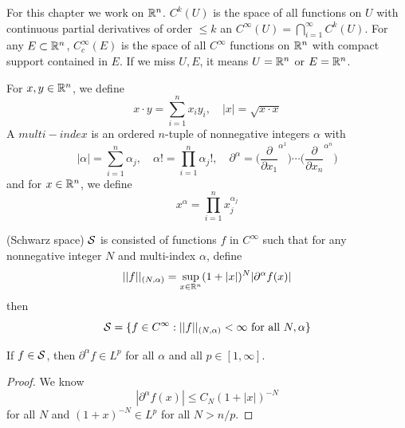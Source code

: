 \begin{definition}
    For this chapter we work on $\mathbb{R}^n$. $C^k(U)$ is the space of all functions on $U$ with continuous partial derivatives of order $\leq k$ an $C^{\infty}(U) = \bigcap_{i=1}^{\infty}C^k(U)$. For any $E\subset \mathbb{R}^n$, $C_c^{\infty}(E)$ is the space of all $C^{\infty}$ functions on $\mathbb{R}^n$ with compact support contained in $E$. If we miss $U,E$, it means $U = \mathbb{R}^n$ or $E = \mathbb{R}^n$.\par
    For $x,y\in \mathbb{R}^n$, we define
    \[x\cdot y = \sum\limits_{i=1}^n x_iy_i,\quad |x| = \sqrt{x\cdot x}\]
    A $multi-index$ is an ordered $n$-tuple of nonnegative integers $\alpha$ with
    \[|\alpha| = \sum\limits_{i=1}^n \alpha_j,\quad \alpha! = \prod_{i=1}^n \alpha_j!,\quad \partial^{\alpha} = \Big(\dfrac{\partial}{\partial x_1}^{\alpha^1}\Big)\cdots\Big(\dfrac{\partial}{\partial x_n}^{\alpha^n}\Big)
    \]
    and for $x\in \mathbb{R}^n$, we define
    \[
    x^{\alpha} = \prod_{i=1}^n x_j^{\alpha_j}
    \]
\end{definition}

\begin{definition}
    (Schwarz space) $\mathcal{S}$ is consisted of functions $f$ in $C^{\infty}$ such that for any nonnegative integer $N$ and multi-index $\alpha$, define
    \[
    ||f||_{(N,\alpha)} = \sup_{x\in\mathbb{R}^n}(1+|x|)^N |\partial^{\alpha}f(x)|
    \]
    then
    \[
    \mathcal{S} = \{f\in C^{\infty}:||f||_{(N,\alpha)} < \infty\text{ for all }N,\alpha\}
    \]
\end{definition}

\begin{proposition}
    If $f\in\mathcal{S}$, then $\partial^{\alpha} f \in L^p$ for all $\alpha$ and all $p\in[1,\infty]$.
\end{proposition}
\begin{proof}
    We know
    \[|\partial^{\alpha} f(x)| \leq C_N(1+|x|)^{-N}\]
    for all $N$ and $(1+x)^{-N} \in L^p$ for all $N > n/p$.   
\end{proof}

